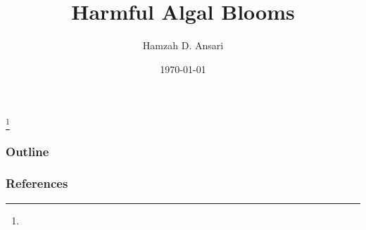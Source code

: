 \documentclass{beamer}
\title{Harmful Algal Blooms}
\author{Hamzah D. Ansari}
\institute{Oakland University}
\date{\today}
\begin{document}
\renewcommand{\footnotesize}{\tiny}


\let\thefootnote\relax\footnote{}

\begin{frame} 
\titlepage
\end{frame}

\begin{frame}
	\frametitle{Outline}
	\tableofcontents
\end{frame}



\begin{frame}[allowframebreaks]
	\frametitle{References}
	\printbibliography
\end{frame}
\end{document}
